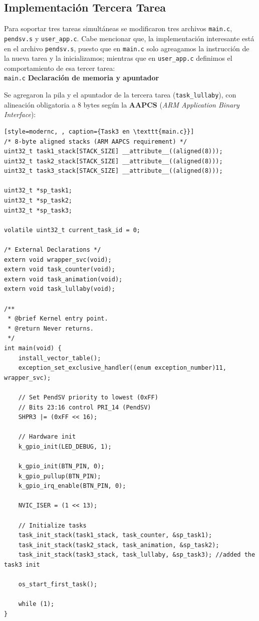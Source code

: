\documentclass[12pt,letterpaper]{article}
\begin{document}
\subsection*{Implementación Tercera Tarea}

Para soportar tres tareas simultáneas se modificaron tres archivos \texttt{main.c}, \texttt{pendsv.s} y \texttt{user\_app.c}. Cabe mencionar que, la implementación interesante está en el archivo \texttt{pendsv.s}, puesto que en \texttt{main.c} solo agreagamos la instrucción de la nueva tarea y la inicializamos; mientras que en \texttt{user\_app.c} definimos el comportamiento de esa tercer tarea:\\

\texttt{main.c} \textbf{Declaración de memoria y apuntador}

\noindent
Se agregaron la pila y el apuntador de la tercera tarea (\texttt{task\_lullaby}), con alineación obligatoria a 8 bytes según la \textbf{AAPCS} (\textit{ARM Application Binary Interface}):

\begin{lstlisting}[style=modernc, , caption={Task3 en \texttt{main.c}}]
/* 8-byte aligned stacks (ARM AAPCS requirement) */
uint32_t task1_stack[STACK_SIZE] __attribute__((aligned(8)));
uint32_t task2_stack[STACK_SIZE] __attribute__((aligned(8)));
uint32_t task3_stack[STACK_SIZE] __attribute__((aligned(8)));

uint32_t *sp_task1;
uint32_t *sp_task2;
uint32_t *sp_task3;

volatile uint32_t current_task_id = 0;

/* External Declarations */
extern void wrapper_svc(void);
extern void task_counter(void);
extern void task_animation(void);
extern void task_lullaby(void);

/**
 * @brief Kernel entry point.
 * @return Never returns.
 */
int main(void) {
    install_vector_table();
    exception_set_exclusive_handler((enum exception_number)11, wrapper_svc);
    
    // Set PendSV priority to lowest (0xFF)
    // Bits 23:16 control PRI_14 (PendSV)
    SHPR3 |= (0xFF << 16);

    // Hardware init
    k_gpio_init(LED_DEBUG, 1); 
    
    k_gpio_init(BTN_PIN, 0);   
    k_gpio_pullup(BTN_PIN);
    k_gpio_irq_enable(BTN_PIN, 0); 
    
    NVIC_ISER = (1 << 13);

    // Initialize tasks
    task_init_stack(task1_stack, task_counter, &sp_task1);
    task_init_stack(task2_stack, task_animation, &sp_task2);
    task_init_stack(task3_stack, task_lullaby, &sp_task3); //added the task3 init
    
    os_start_first_task();

    while (1);
}
\end{lstlisting}
\end{document}
